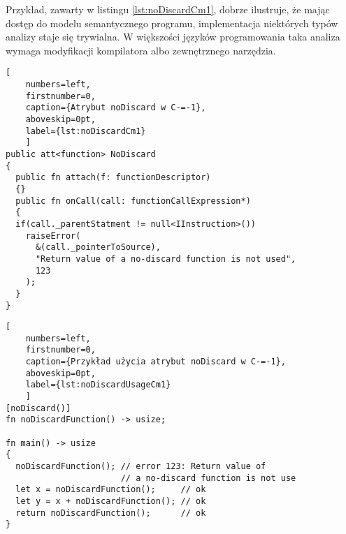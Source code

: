 Przykład, zawarty w listingu \ref{lst:noDiscardCm1}, dobrze ilustruje, że mając dostęp do modelu semantycznego programu, implementacja niektórych typów analizy staje się trywialna.
W większości języków programowania taka analiza wymaga modyfikacji kompilatora albo zewnętrznego narzędzia.

\begin{minipage}{\linewidth}
  
  \begin{lstlisting}[
    numbers=left,
    firstnumber=0,
    caption={Atrybut noDiscard w C-=-1},
    aboveskip=0pt,
    label={lst:noDiscardCm1}
    ]
public att<function> NoDiscard
{
  public fn attach(f: functionDescriptor)
  {}
  public fn onCall(call: functionCallExpression*)
  {
  if(call._parentStatment != null<IInstruction>())
    raiseError(
      &(call._pointerToSource), 
      "Return value of a no-discard function is not used",
      123
    );
  }
}
\end{lstlisting}
\end{minipage}


\begin{minipage}{\linewidth}
  
  \begin{lstlisting}[
    numbers=left,
    firstnumber=0,
    caption={Przykład użycia atrybut noDiscard w C-=-1},
    aboveskip=0pt,
    label={lst:noDiscardUsageCm1}
    ]
[noDiscard()]
fn noDiscardFunction() -> usize;

fn main() -> usize
{
  noDiscardFunction(); // error 123: Return value of
                       // a no-discard function is not use
  let x = noDiscardFunction();     // ok
  let y = x + noDiscardFunction(); // ok
  return noDiscardFunction();      // ok
}
\end{lstlisting}
\end{minipage}


